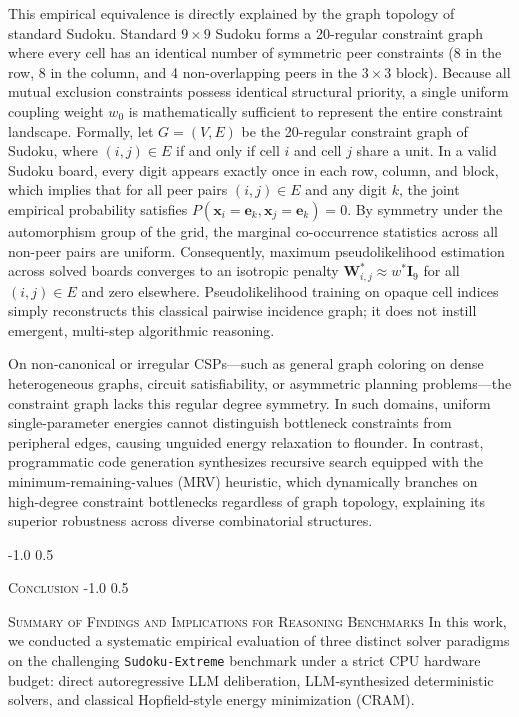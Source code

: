 \documentclass{article} %
\makeatletter
\renewcommand{\section}{\@startsection{section}{1}{\z@}%
  {-1.0\baselineskip}%
  {0.5\baselineskip}%
  {\normalfont\fontsize{12pt}{14pt}\selectfont\scshape\raggedright}}
\renewcommand{\subsection}{\@startsection{subsection}{2}{\z@}%
  {-1.0\baselineskip}%
  {0.5\baselineskip}%
  {\normalfont\fontsize{10pt}{12pt}\selectfont\scshape\raggedright}}
\makeatother
\begin{document}
This empirical equivalence is directly explained by the graph topology of standard Sudoku. Standard $9 \times 9$ Sudoku forms a 20-regular constraint graph where every cell has an identical number of symmetric peer constraints (8 in the row, 8 in the column, and 4 non-overlapping peers in the $3 \times 3$ block). Because all mutual exclusion constraints possess identical structural priority, a single uniform coupling weight $w_0$ is mathematically sufficient to represent the entire constraint landscape. Formally, let $G = (V, E)$ be the 20-regular constraint graph of Sudoku, where $(i, j) \in E$ if and only if cell $i$ and cell $j$ share a unit. In a valid Sudoku board, every digit appears exactly once in each row, column, and block, which implies that for all peer pairs $(i, j) \in E$ and any digit $k$, the joint empirical probability satisfies $P(\mathbf{x}_i = \mathbf{e}_k, \mathbf{x}_j = \mathbf{e}_k) = 0$. By symmetry under the automorphism group of the grid, the marginal co-occurrence statistics across all non-peer pairs are uniform. Consequently, maximum pseudolikelihood estimation across solved boards converges to an isotropic penalty $\mathbf{W}_{i,j}^* \approx w^* \mathbf{I}_9$ for all $(i, j) \in E$ and zero elsewhere. Pseudolikelihood training on opaque cell indices simply reconstructs this classical pairwise incidence graph; it does not instill emergent, multi-step algorithmic reasoning.

On non-canonical or irregular CSPs—such as general graph coloring on dense heterogeneous graphs, circuit satisfiability, or asymmetric planning problems—the constraint graph lacks this regular degree symmetry. In such domains, uniform single-parameter energies cannot distinguish bottleneck constraints from peripheral edges, causing unguided energy relaxation to flounder. In contrast, programmatic code generation synthesizes recursive search equipped with the minimum-remaining-values (MRV) heuristic, which dynamically branches on high-degree constraint bottlenecks regardless of graph topology, explaining its superior robustness across diverse combinatorial structures.

\section{\textsc{Conclusion}}
\label{sec:conclusion}
\subsection{\textsc{Summary of Findings and Implications for Reasoning Benchmarks}}
In this work, we conducted a systematic empirical evaluation of three distinct solver paradigms on the challenging \texttt{Sudoku-Extreme} benchmark under a strict CPU hardware budget: direct autoregressive LLM deliberation, LLM-synthesized deterministic solvers, and classical Hopfield-style energy minimization (CRAM).
\end{document}
